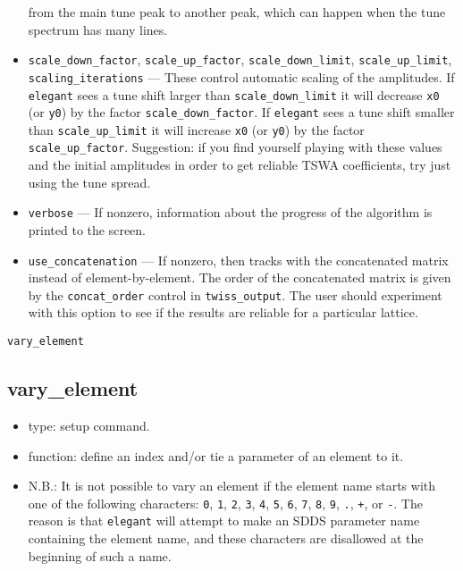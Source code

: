 \documentclass[11pt]{article}
\begin{document}
\begin{itemize}
        from the main tune peak to another peak, which can happen when the tune spectrum
        has many lines.
\item \verb|scale_down_factor|, \verb|scale_up_factor|, \verb|scale_down_limit|, 
        \verb|scale_up_limit|, \verb|scaling_iterations| --- These control automatic scaling
        of the amplitudes.  If {\tt elegant} sees a tune shift larger than \verb|scale_down_limit|
        it will decrease \verb|x0| (or \verb|y0|) by the factor \verb|scale_down_factor|. 
        If  {\tt elegant} sees a tune shift smaller than \verb|scale_up_limit|
        it will increase \verb|x0| (or \verb|y0|) by the factor \verb|scale_up_factor|. 
        Suggestion: if you find yourself playing with these values and the initial amplitudes
        in order to get reliable TSWA coefficients, try just using the tune spread.
\item \verb|verbose| --- If nonzero, information about the progress of the algorithm is 
        printed to the screen.
\item \verb|use_concatenation| --- If nonzero, then tracks with the concatenated matrix instead
        of element-by-element.  The order
        of the concatenated matrix is given by the \verb|concat_order| control in
        \verb|twiss_output|. The user should experiment with this option to see if the
        results are reliable for a particular lattice.
\end{itemize}

\begin{latexonly}
\newpage
\begin{center}{\Large\verb|vary_element|}\end{center}
\end{latexonly}
\subsection{vary\_element \label{subsec:varyelement}}

\begin{itemize}
\item type: setup command.
\item function: define an index and/or tie a parameter of an element to it.
\item N.B.: It is not possible to vary an element if the element name starts with one of the following
characters: 
\verb|0|, \verb|1|, \verb|2|, \verb|3|, \verb|4|, \verb|5|, \verb|6|, \verb|7|, \verb|8|,
\verb|9|, \verb|.|, \verb|+|, or \verb|-|.  The reason is that {\tt elegant} will attempt to 
make an SDDS parameter name containing the element name, and these characters are disallowed
at the beginning of such a name.
\end{itemize}
\end{document}
